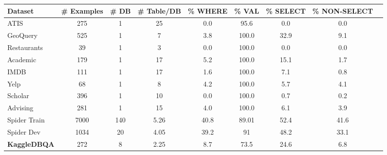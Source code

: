 \documentclass[11pt,a4paper]{article}
\newcommand{\systemname}{\mbox{KaggleDBQA}\xspace}
\newcommand{\sql}[1]{\lstinline[language=SQL, basicstyle=\footnotesize\ttfamily]{#1}}
\begin{document}
\begin{table*}[t]
    \centering
    \small
    \caption{Comparison of text-to-SQL datasets.
        We follow the data filtering rules of \citet{suhr2020exploring} and \citet{deng2020structure}, which reduces the effective number of examples from the original datasets to make them consistent.
        \%WHERE measures the percentage of examples where all
        \sql{WHERE}/\sql{HAVING} columns in the SQL query are explicitly mentioned in the NL question.
        \%VAL compares all the values in the SQL queries; \%SELECT compares all the \sql{SELECT} columns;
        \%NON SELECT compares all columns except the \sql{SELECT} columns.
        \systemname has low column mention percentage and contains databases with multiple tables.
}
    \label{tab:stats}
    \begin{tabular}{lcccccccc}
    \toprule
        Dataset & \# Examples                 & \# DB  & \# Table/DB  & \% WHERE  &  \% VAL &  \% SELECT  & \% NON-SELECT  \\
        \midrule
                        ATIS & 275  & 1 & 25 & 0.0 & 95.6 & 0.0 & 0.0 \\
                        GeoQuery & 525 & 1 & 7 & 3.8 & 100.0 & 32.9 & 9.1 \\
                        Restaurants & 39 & 1  & 3 & 0.0 & 100.0 & 0.0 & 0.0 \\
                        Academic & 179 & 1  & 17 & 5.2 & 100.0 & 15.1 & 1.7 \\
                        IMDB & 111 & 1 & 17 & 1.6 & 100.0 & 7.1 & 0.8  \\
                        Yelp & 68  & 1  & 8 & 4.2 & 100.0 & 5.7 & 4.1 \\
                        Scholar & 396 & 1  & 10 & 0.0 & 100.0 & 0.7 & 0.2  \\
                        Advising & 281 & 1  & 15 & 4.0 & 100.0 & 6.1 & 3.9 \\
                        \midrule
Spider Train &  7000 & 140 &  5.26 & 40.8  & 89.01  & 52.4 & 41.6  \\
                        Spider Dev & 1034  & 20 &  4.05  & 39.2 & 91  & 48.2 &  33.1 \\
\midrule
                        \textbf{\systemname} & 272 & 8  &  2.25 & 8.7 & 73.5 & 24.6 & 6.8 \\
                        \bottomrule
    \end{tabular}
\end{table*}
\end{document}
